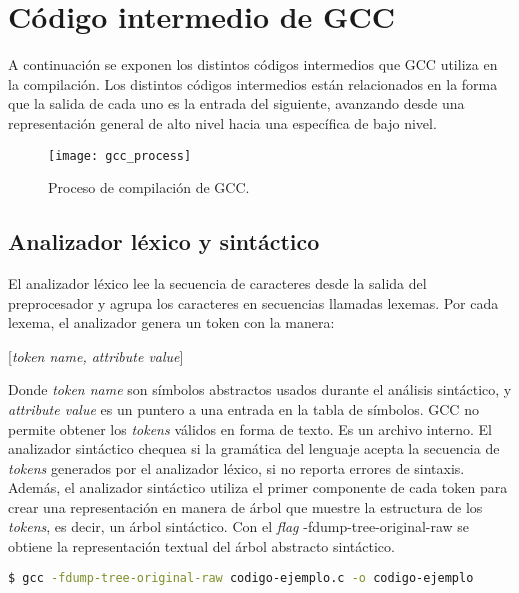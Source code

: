 \chapter{Código intermedio de GCC}

A continuación se exponen los distintos códigos intermedios que GCC utiliza en la compilación. 
Los distintos códigos intermedios están relacionados en la forma que la salida 
de cada uno es la entrada del siguiente, avanzando desde una representación general de alto nivel 
hacia una específica de bajo nivel. 

\begin{figure}[ht]
    \begingroup
        \centering
            \texttt{[image: gcc\_process]}
            \caption{Proceso de compilación de GCC.}
            \label{fig:gcc_process}
        \par
    \endgroup
\end{figure}

\section{Analizador léxico y sintáctico}
El analizador léxico lee la secuencia de caracteres desde la salida del preprocesador y agrupa los 
caracteres en secuencias llamadas lexemas.
Por cada lexema, el analizador genera un token con la manera:
\begin{center}
    [\emph{token name, attribute value}]
\end{center}
Donde \emph{token name} son símbolos abstractos usados durante el análisis sintáctico,
y \emph{attribute value} es un puntero a una entrada en la tabla de símbolos.
GCC no permite obtener los \emph{tokens} válidos en forma de texto. Es un archivo interno.
El analizador sintáctico chequea si la gramática del lenguaje acepta la secuencia
de \emph{tokens} generados por el analizador léxico, si no reporta errores de sintaxis. 
Además, el analizador sintáctico utiliza el primer componente de cada token para crear una representación en manera de árbol 
que muestre la estructura de los \emph{tokens}, es decir, un árbol sintáctico\cite{GCCast}.
Con el \emph{flag} -fdump-tree-original-raw se obtiene la representación textual del árbol abstracto sintáctico.

\begin{lstlisting}[label=comandoC, caption= Comando de compilación para obtener codigo-ejemplo.c.005t.original \cite{repositorio} para GCC., language=bash]
    $ gcc -fdump-tree-original-raw codigo-ejemplo.c -o codigo-ejemplo  \end{lstlisting}

